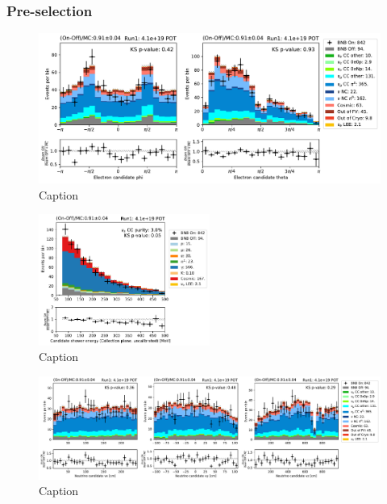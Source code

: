 \label{sec:nueselection:inclusive}

\subsubsection{Pre-selection}

\begin{figure}
    \centering
    \includegraphics[width=\textwidth]{NueCCsel/Images/run1/pre_angles.pdf}
    \caption{Caption}
    \label{fig:pre_shower_E_pdg}
\end{figure}

\begin{figure}
    \centering
    \includegraphics[width=0.5\textwidth]{NueCCsel/Images/run1/pre_shower_E_pdg.pdf}
    \caption{Caption}
    \label{fig:pre_shower_E_pdg}
\end{figure}

\begin{figure}
    \centering
    \includegraphics[width=\textwidth]{NueCCsel/Images/run1/pre_vtx.pdf}
    \caption{Caption}
    \label{fig:pre_vtx}
\end{figure}


